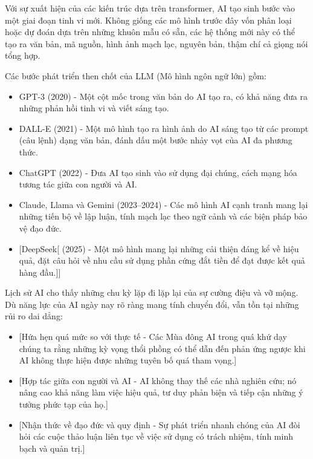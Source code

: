 Với sự xuất hiện của các kiến trúc dựa trên transformer, AI tạo sinh bước vào một giai đoạn tinh vi mới. Không giống các mô hình trước đây vốn phân loại hoặc dự đoán dựa trên những khuôn mẫu có sẵn, các hệ thống mới này có thể tạo ra văn bản, mã nguồn, hình ảnh mạch lạc, nguyên bản, thậm chí cả giọng nói tổng hợp.

Các bước phát triển then chốt của LLM (Mô hình ngôn ngữ lớn) gồm:

\begin{itemize}
\item
  GPT-3 (2020) - Một cột mốc trong văn bản do AI tạo ra, có khả năng đưa ra những phản hồi tinh vi và viết sáng tạo.
\item
  DALL-E (2021) - Một mô hình tạo ra hình ảnh do AI sáng tạo từ các prompt (câu lệnh) dạng văn bản, đánh dấu một bước nhảy vọt của AI đa phương thức.
\item
  ChatGPT (2022) - Đưa AI tạo sinh vào sử dụng đại chúng, cách mạng hóa tương tác giữa con người và AI.
\item
  Claude, Llama và Gemini (2023--2024) - Các mô hình AI cạnh tranh mang lại những tiến bộ về lập luận, tính mạch lạc theo ngữ cảnh và các biện pháp bảo vệ đạo đức.
\item
  {[}DeepSeek{[} (2025) - Một mô hình mang lại những cải thiện đáng kể về hiệu quả, đặt câu hỏi về nhu cầu sử dụng phần cứng đắt tiền để đạt được kết quả hàng đầu.{]}{]}
\end{itemize}

Lịch sử AI cho thấy những chu kỳ lặp đi lặp lại của sự cường điệu và vỡ mộng. Dù năng lực của AI ngày nay rõ ràng mang tính chuyển đổi, vẫn tồn tại những rủi ro dai dẳng:

\begin{itemize}
\item
  {[}Hứa hẹn quá mức so với thực tế - Các Mùa đông AI trong quá khứ dạy chúng ta rằng những kỳ vọng thổi phồng có thể dẫn đến phản ứng ngược khi AI không thực hiện được những tuyên bố quá tham vọng.{]}
\item
  {[}Hợp tác giữa con người và AI - AI không thay thế các nhà nghiên cứu; nó nâng cao khả năng làm việc hiệu quả, tư duy phản biện và tiếp cận những ý tưởng phức tạp của họ.{]}
\item
  {[}Nhận thức về đạo đức và quy định - Sự phát triển nhanh chóng của AI đòi hỏi các cuộc thảo luận liên tục về việc sử dụng có trách nhiệm, tính minh bạch và quản trị.{]}
\end{itemize}

